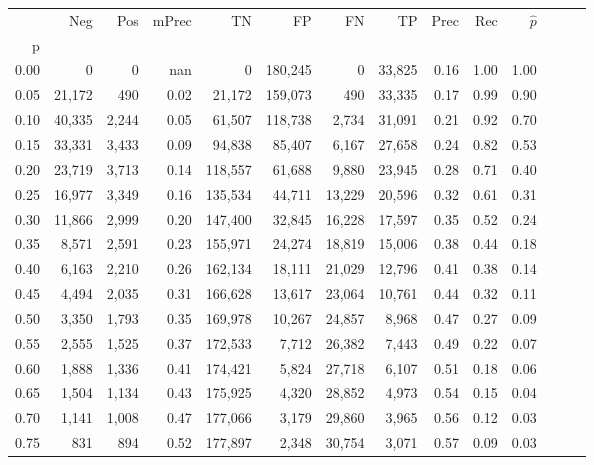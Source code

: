\begin{tabular}{rrrrrrrrrrrrrr}
\toprule
{} &     Neg &    Pos & mPrec &       TN &       FP &      FN &      TP &  Prec &   Rec & $\hat{p}$ \\
p    &         &        &       &          &          &         &         &       &       &           \\
\midrule
0.00 &       0 &      0 &   nan &        0 &  180,245 &       0 &  33,825 &  0.16 &  1.00 &      1.00 \\
0.05 &  21,172 &    490 &  0.02 &   21,172 &  159,073 &     490 &  33,335 &  0.17 &  0.99 &      0.90 \\
0.10 &  40,335 &  2,244 &  0.05 &   61,507 &  118,738 &   2,734 &  31,091 &  0.21 &  0.92 &      0.70 \\
0.15 &  33,331 &  3,433 &  0.09 &   94,838 &   85,407 &   6,167 &  27,658 &  0.24 &  0.82 &      0.53 \\
0.20 &  23,719 &  3,713 &  0.14 &  118,557 &   61,688 &   9,880 &  23,945 &  0.28 &  0.71 &      0.40 \\
0.25 &  16,977 &  3,349 &  0.16 &  135,534 &   44,711 &  13,229 &  20,596 &  0.32 &  0.61 &      0.31 \\
0.30 &  11,866 &  2,999 &  0.20 &  147,400 &   32,845 &  16,228 &  17,597 &  0.35 &  0.52 &      0.24 \\
0.35 &   8,571 &  2,591 &  0.23 &  155,971 &   24,274 &  18,819 &  15,006 &  0.38 &  0.44 &      0.18 \\
0.40 &   6,163 &  2,210 &  0.26 &  162,134 &   18,111 &  21,029 &  12,796 &  0.41 &  0.38 &      0.14 \\
0.45 &   4,494 &  2,035 &  0.31 &  166,628 &   13,617 &  23,064 &  10,761 &  0.44 &  0.32 &      0.11 \\
0.50 &   3,350 &  1,793 &  0.35 &  169,978 &   10,267 &  24,857 &   8,968 &  0.47 &  0.27 &      0.09 \\
0.55 &   2,555 &  1,525 &  0.37 &  172,533 &    7,712 &  26,382 &   7,443 &  0.49 &  0.22 &      0.07 \\
0.60 &   1,888 &  1,336 &  0.41 &  174,421 &    5,824 &  27,718 &   6,107 &  0.51 &  0.18 &      0.06 \\
0.65 &   1,504 &  1,134 &  0.43 &  175,925 &    4,320 &  28,852 &   4,973 &  0.54 &  0.15 &      0.04 \\
0.70 &   1,141 &  1,008 &  0.47 &  177,066 &    3,179 &  29,860 &   3,965 &  0.56 &  0.12 &      0.03 \\
0.75 &     831 &    894 &  0.52 &  177,897 &    2,348 &  30,754 &   3,071 &  0.57 &  0.09 &      0.03 \\

\end{tabular}
